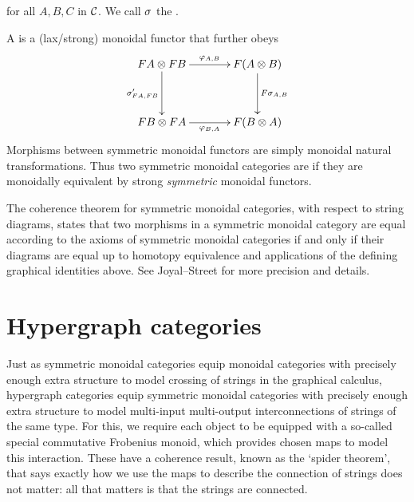 for all $A,B,C$ in $\mathcal C$.  We call $\sigma$ the .

A  is a (lax/strong) monoidal
functor that further obeys
\[
\xymatrixcolsep{3pc}
\xymatrixrowsep{3pc}
\xymatrix{
FA \ot FB \ar[r]^{\varphi_{A,B}} \ar[d]_{\s'_{FA,FB}} & F(A \ot B)\ar[d]^{F\s_{A,B}}\\
FB \ot FA \ar[r]_{\varphi_{B,A}} & F(B \ot A)
}
\]
Morphisms between symmetric monoidal functors are simply monoidal natural
transformations. Thus two symmetric monoidal categories are  if they are monoidally equivalent by strong
\emph{symmetric} monoidal functors.

The coherence theorem for symmetric monoidal categories, with respect to string
diagrams, states that two morphisms in a symmetric monoidal category are equal
according to the axioms of symmetric monoidal categories if and only if their
diagrams are equal up to homotopy equivalence and applications of the defining
graphical identities above. See Joyal--Street \cite[Theorem 2.3]{JoyStr} for
more precision and details.

\section{Hypergraph categories}
Just as symmetric monoidal categories equip monoidal categories with precisely
enough extra structure to model crossing of strings in the graphical calculus,
hypergraph categories equip symmetric monoidal categories with precisely enough
extra structure to model multi-input multi-output interconnections of strings of
the same type. For this, we require each object to be equipped with a so-called
special commutative Frobenius monoid, which provides chosen maps to model this
interaction. These have a coherence result, known as the `spider theorem', that
says exactly how we use the maps to describe the connection of strings does not
matter: all that matters is that the strings are connected. 

